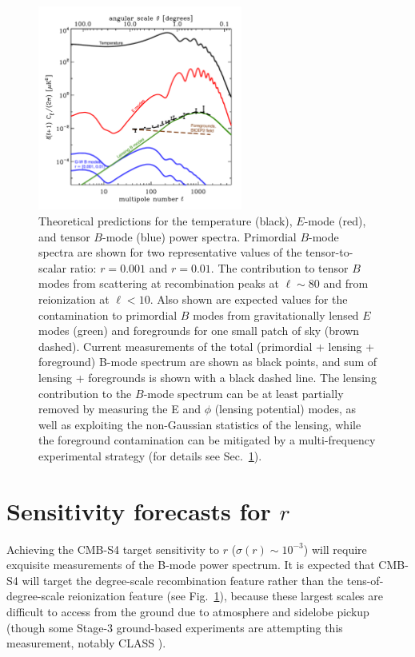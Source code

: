 \begin{figure}[h]
\begin{center}
\includegraphics[width=0.6\textwidth]{Inflation/cmb_powspec_for_s4scibook_with_data_uk2.pdf}
\end{center}
\caption{Theoretical predictions for the temperature (black), 
$E$-mode (red), and tensor $B$-mode (blue) power spectra. Primordial 
$B$-mode spectra are shown for two representative values of the tensor-to-scalar
ratio: $r=0.001$ and $r=0.01.$ 
The contribution to tensor $B$ modes from scattering at recombination peaks at $\ell \sim 80$
and from reionization at $\ell < 10$.
Also shown are expected values for the contamination
to primordial $B$ modes from gravitationally lensed $E$ modes (green) and foregrounds
for one small patch of sky (brown dashed). Current measurements of the total (primordial +
lensing + foreground) B-mode spectrum are shown as black points, and sum of lensing + foregrounds
is shown with a black dashed line.
The lensing contribution
to the $B$-mode spectrum can be at least partially removed by measuring the 
E and $\phi$ (lensing potential) modes, as well as exploiting the non-Gaussian statistics of the lensing, while the foreground contamination
can be mitigated by a multi-frequency experimental strategy (for details see Sec.~\ref{sec:needs}).
}
\label{fig:clall}
\end{figure}

\section{Sensitivity forecasts for $r$}
\label{sec:needs}

Achieving the CMB-S4 target sensitivity to $r$ ($\sigma(r) \sim 10^{-3}$) will require exquisite measurements of the B-mode power spectrum. 
It is expected that CMB-S4 will target the degree-scale recombination feature rather than the tens-of-degree-scale reionization feature (see Fig.~\ref{fig:clall}), because these largest scales are difficult to access from the ground due to atmosphere and sidelobe pickup (though some Stage-3 ground-based experiments are attempting this measurement, notably CLASS \cite{Essinger-Hileman:2014pja}).


